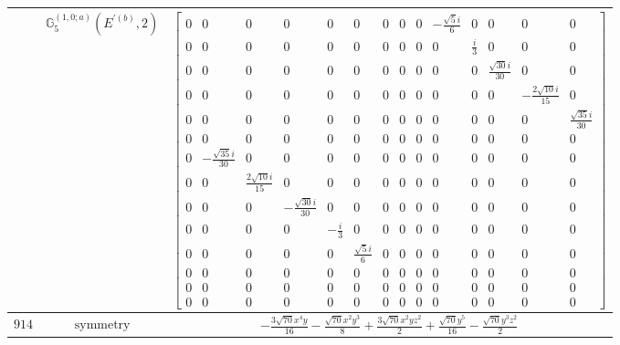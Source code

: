 \documentclass[fleqn,8pt,landscape]{jsarticle}
\begin{document}
\begin{longtable}{ccc}
$  $ & $ \mathbb{G}_{5}^{(1,0;a)}(E^{\prime(b)},2) $ & $ \begin{bmatrix} 0 & 0 & 0 & 0 & 0 & 0 & 0 & 0 & 0 & - \frac{\sqrt{5} i}{6} & 0 & 0 & 0 & 0 \\ 0 & 0 & 0 & 0 & 0 & 0 & 0 & 0 & 0 & 0 & \frac{i}{3} & 0 & 0 & 0 \\ 0 & 0 & 0 & 0 & 0 & 0 & 0 & 0 & 0 & 0 & 0 & \frac{\sqrt{30} i}{30} & 0 & 0 \\ 0 & 0 & 0 & 0 & 0 & 0 & 0 & 0 & 0 & 0 & 0 & 0 & - \frac{2 \sqrt{10} i}{15} & 0 \\ 0 & 0 & 0 & 0 & 0 & 0 & 0 & 0 & 0 & 0 & 0 & 0 & 0 & \frac{\sqrt{35} i}{30} \\ 0 & 0 & 0 & 0 & 0 & 0 & 0 & 0 & 0 & 0 & 0 & 0 & 0 & 0 \\ 0 & - \frac{\sqrt{35} i}{30} & 0 & 0 & 0 & 0 & 0 & 0 & 0 & 0 & 0 & 0 & 0 & 0 \\ 0 & 0 & \frac{2 \sqrt{10} i}{15} & 0 & 0 & 0 & 0 & 0 & 0 & 0 & 0 & 0 & 0 & 0 \\ 0 & 0 & 0 & - \frac{\sqrt{30} i}{30} & 0 & 0 & 0 & 0 & 0 & 0 & 0 & 0 & 0 & 0 \\ 0 & 0 & 0 & 0 & - \frac{i}{3} & 0 & 0 & 0 & 0 & 0 & 0 & 0 & 0 & 0 \\ 0 & 0 & 0 & 0 & 0 & \frac{\sqrt{5} i}{6} & 0 & 0 & 0 & 0 & 0 & 0 & 0 & 0 \\ 0 & 0 & 0 & 0 & 0 & 0 & 0 & 0 & 0 & 0 & 0 & 0 & 0 & 0 \\ 0 & 0 & 0 & 0 & 0 & 0 & 0 & 0 & 0 & 0 & 0 & 0 & 0 & 0 \\ 0 & 0 & 0 & 0 & 0 & 0 & 0 & 0 & 0 & 0 & 0 & 0 & 0 & 0 \end{bmatrix} $ \\ \hline
$ 914 $ & $ \text{symmetry} $ & $ - \frac{3 \sqrt{70} x^{4} y}{16} - \frac{\sqrt{70} x^{2} y^{3}}{8} + \frac{3 \sqrt{70} x^{2} y z^{2}}{2} + \frac{\sqrt{70} y^{5}}{16} - \frac{\sqrt{70} y^{3} z^{2}}{2} $ \\

\end{longtable}
\end{document}
